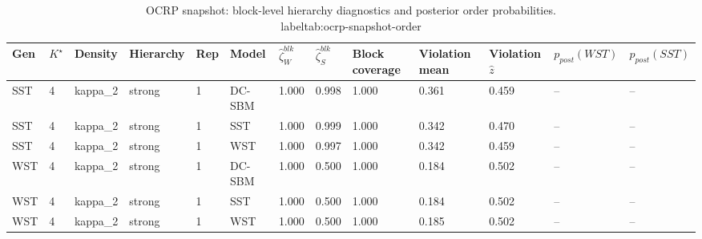 \begin{table}[!h]
\centering
\caption{OCRP snapshot: block-level hierarchy diagnostics and posterior order probabilities.\\label{tab:ocrp-snapshot-order}}
\centering
\begin{tabular}[t]{lllllllllllll}
\toprule
Gen & $K^\star$ & Density & Hierarchy & Rep & Model & $\widehat\zeta_W^{blk}$ & $\widehat\zeta_S^{blk}$ & Block coverage & Violation mean & Violation $\hat z$ & $p_{post}(WST)$ & $p_{post}(SST)$\\
\midrule
SST & 4 & kappa_2 & strong & 1 & DC-SBM & 1.000 & 0.998 & 1.000 & 0.361 & 0.459 & -- & --\\
SST & 4 & kappa_2 & strong & 1 & SST & 1.000 & 0.999 & 1.000 & 0.342 & 0.470 & -- & --\\
SST & 4 & kappa_2 & strong & 1 & WST & 1.000 & 0.997 & 1.000 & 0.342 & 0.459 & -- & --\\
WST & 4 & kappa_2 & strong & 1 & DC-SBM & 1.000 & 0.500 & 1.000 & 0.184 & 0.502 & -- & --\\
WST & 4 & kappa_2 & strong & 1 & SST & 1.000 & 0.500 & 1.000 & 0.184 & 0.502 & -- & --\\
WST & 4 & kappa_2 & strong & 1 & WST & 1.000 & 0.500 & 1.000 & 0.185 & 0.502 & -- & --\\
\bottomrule
\end{tabular}
\end{table}
